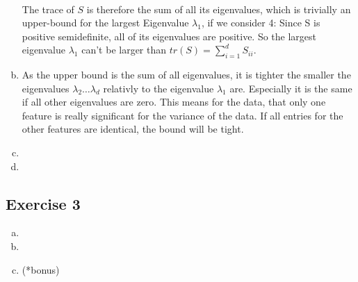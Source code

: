 \documentclass[10pt,a4paper]{article}
\begin{document}
\begin{enumerate}[(a)]
\begin{align*}
\end{align*}
The trace of $S$ is therefore the sum of all its eigenvalues, which is trivially an upper-bound for the largest Eigenvalue $\lambda_1$, if we consider 4: Since S is positive semidefinite, all of its eigenvalues are positive. So the largest eigenvalue $\lambda_1$ can't be larger than $tr(S) = \sum^d_{i=1} S_{ii}$.
\item As the upper bound is the sum of all eigenvalues, it is tighter the smaller the eigenvalues $\lambda_2 \dots \lambda_d$ relativly to the eigenvalue $\lambda_1$ are. Especially it is the same if all other eigenvalues are zero. This means for the data, that only one feature is really significant for the variance of the data. If all entries for the other features are identical, the bound will be tight.
\item 
\item
\end{enumerate}
\subsection*{Exercise 3}
\begin{enumerate}[(a)]
\item
\item
\item (*bonus)
\end{enumerate}
\end{document}
